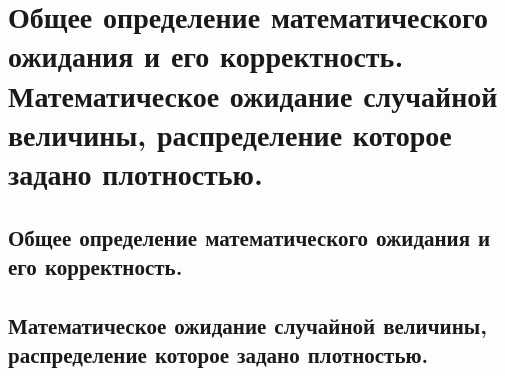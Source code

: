 \section{Общее определение математического ожидания и его корректность. Математическое ожидание случайной величины, распределение которое задано плотностью.}

\subsection{Общее определение математического ожидания и его корректность.}

\subsection{Математическое ожидание случайной величины, распределение которое задано плотностью.}